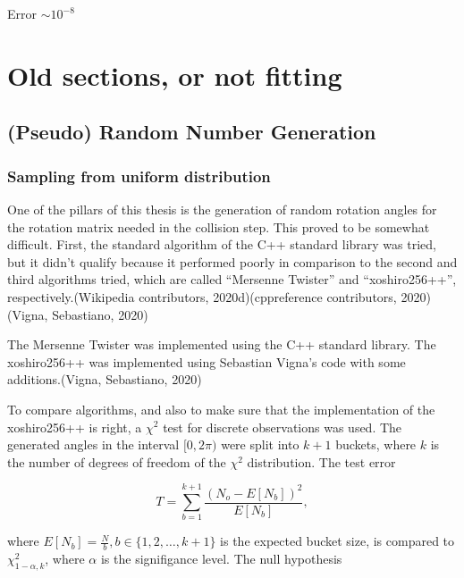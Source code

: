 \documentclass[
]{article}
\begin{document}
Error \(\sim 10^{-8}\)

\hypertarget{old-sections-or-not-fitting}{%
\section{Old sections, or not
fitting}\label{old-sections-or-not-fitting}}

\hypertarget{pseudo-random-number-generation}{%
\subsection{(Pseudo) Random Number
Generation}\label{pseudo-random-number-generation}}

\hypertarget{sampling-from-uniform-distribution}{%
\subsubsection{Sampling from uniform
distribution}\label{sampling-from-uniform-distribution}}

One of the pillars of this thesis is the generation of random rotation
angles for the rotation matrix needed in the collision step. This proved
to be somewhat difficult. First, the standard algorithm of the C++
standard library was tried, but it didn't qualify because it performed
poorly in comparison to the second and third algorithms tried, which are
called ``Mersenne Twister'' and ``xoshiro256++'',
respectively.(Wikipedia contributors, 2020d)(cppreference contributors,
2020)(Vigna, Sebastiano, 2020)

The Mersenne Twister was implemented using the C++ standard library. The
xoshiro256++ was implemented using Sebastian Vigna's code with some
additions.(Vigna, Sebastiano, 2020)

To compare algorithms, and also to make sure that the implementation of
the xoshiro256++ is right, a \(\chi^2\) test for discrete observations
was used. The generated angles in the interval \([0, 2\pi)\) were split
into \(k+1\) buckets, where \(k\) is the number of degrees of freedom of
the \(\chi^2\) distribution. The test error

\begin{equation}
T = \sum_{b=1}^{k+1}{\frac{(N_o - E[N_b])^2}{E[N_b]}},
\end{equation}

where \(E[N_b] = \frac{N}{b}, b \in \{1, 2, \dots , k+1\}\) is the
expected bucket size, is compared to \(\chi^2_{1-\alpha, k}\), where
\(\alpha\) is the signifigance level. The null hypothesis
\end{document}
